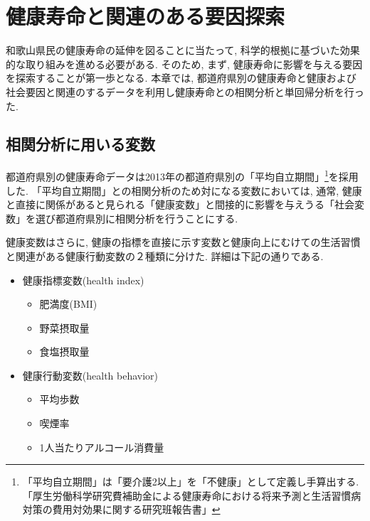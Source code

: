 \chapter{健康寿命と関連のある要因探索}

和歌山県民の健康寿命の延伸を図ることに当たって, 科学的根拠に基づいた効果的な取り組みを進める必要がある. そのため, まず, 健康寿命に影響を与える要因を探索することが第一歩となる.
本章では, 都道府県別の健康寿命と健康および社会要因と関連のするデータを利用し健康寿命との相関分析と単回帰分析を行った.

\section{相関分析に用いる変数}
都道府県別の健康寿命データは2013年の都道府県別の「平均自立期間」\footnote{「平均自立期間」は「要介護2以上」を「不健康」として定義し手算出する. 「厚生労働科学研究費補助金による健康寿命における将来予測と生活習慣病対策の費用対効果に関する研究班報告書」}を採用した. 「平均自立期間」との相関分析のため対になる変数においては, 通常, 健康と直接に関係があると見られる「健康変数」と間接的に影響を与えうる「社会変数」を選び都道府県別に相関分析を行うことにする.

健康変数はさらに, 健康の指標を直接に示す変数と健康向上にむけての生活習慣と関連がある健康行動変数の２種類に分けた. 詳細は下記の通りである.
\begin{itemize} \setlength{\itemsep}{-0.5mm} \setlength{\parskip}{-0.5mm}
	\item 健康指標変数(health index)
	      \begin{itemize} \setlength{\itemsep}{-0.5mm} \setlength{\parskip}{-0.5mm}
		      \item 	肥満度(BMI)
		      \item 	野菜摂取量
		      \item 	食塩摂取量
	      \end{itemize}

	\item 健康行動変数(health behavior)
	      \begin{itemize} \setlength{\itemsep}{-0.5mm} \setlength{\parskip}{-0.5mm}
		      \item 	平均歩数
		      \item 	喫煙率
		      \item 	1人当たりアルコール消費量
	      \end{itemize}
\end{itemize}

